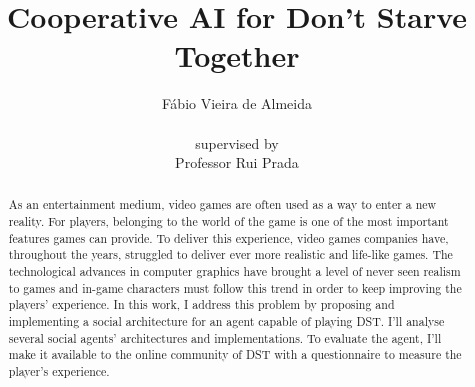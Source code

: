\documentclass[runningheads, a4paper]{llncs}
\begin{document}
\title{Cooperative AI for Don't Starve Together}
\author{Fábio Vieira de Almeida\\  \\ supervised by\\ Professor Rui Prada}

\maketitle

\begin{abstract}
As an entertainment medium, video games are often used as a way to enter a new reality.
For players, belonging to the world of the game is one of the most important features games can provide.
To deliver this experience, video games companies have, throughout the years, struggled to deliver ever more realistic and life-like games.
The technological advances in computer graphics have brought a level of never seen realism to games and in-game characters must follow this trend in order to keep improving the players' experience.
In this work, I address this problem by proposing and implementing a social architecture for an agent capable of playing \ac{DST}.
I'll analyse several social agents' architectures and implementations.
To evaluate the agent, I'll make it available to the online community of \ac{DST} with a questionnaire to measure the player's experience.
\end{abstract}

\tableofcontents
\newpage





\newpage

\printbibliography
\newpage

%
\end{document}
